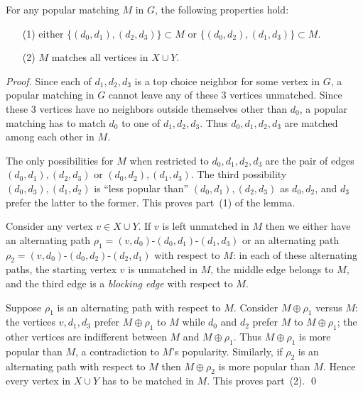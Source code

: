 \documentclass{llncs}
\begin{document}
\begin{lemma}
    \label{new-lemma1}
    For any popular matching $M$ in $G$, the following properties hold:
    \begin{itemize}
    \item[(1)] either $\{(d_0,d_1), (d_2,d_3)\} \subset M$ or $\{(d_0,d_2), (d_1,d_3)\} \subset M$.
    \item[(2)] $M$ matches all vertices in $X \cup Y$.
    \end{itemize}  
\end{lemma}      
\begin{proof}
  Since each of $d_1,d_2,d_3$ is a top choice neighbor for some vertex in $G$, a popular matching in $G$ cannot leave any of these 3 vertices unmatched.
  Since these 3 vertices have no neighbors outside themselves other than $d_0$,
  a popular matching has to match $d_0$ to one of  $d_1,d_2,d_3$.
  Thus $d_0,d_1,d_2,d_3$ are matched among each other in $M$.

  The only possibilities for $M$ when restricted to $d_0,d_1,d_2,d_3$ are the pair of edges $(d_0,d_1), (d_2,d_3)$ or $(d_0,d_2), (d_1,d_3)$.
  The third possibility
  $(d_0,d_3),(d_1,d_2)$ is ``less popular than''  $(d_0,d_1),(d_2,d_3)$ as $d_0,d_2$, and $d_3$ prefer the latter to the former.
  This proves part~(1) of the lemma.

  \smallskip
  
    Consider any vertex $v \in X \cup Y$. If $v$ is left unmatched in $M$ then we either have an alternating path $\rho_1 = (v,d_0)$-$(d_0,d_1)$-$(d_1,d_3)$
    or  an alternating path $\rho_2 = (v,d_0)$-$(d_0,d_2)$-$(d_2,d_1)$ with respect to $M$: in each of these alternating paths, the starting vertex $v$ is
    unmatched in $M$, the middle edge belongs to $M$, and the third edge is a {\em blocking edge} with respect to $M$.

    Suppose $\rho_1$ is an alternating path with respect to $M$. Consider $M \oplus \rho_1$ versus $M$: the vertices $v,d_1,d_3$ prefer $M \oplus \rho_1$
    to $M$ while  $d_0$ and $d_2$ prefer $M$ to $M \oplus \rho_1$; the other vertices are indifferent between $M$ and $M \oplus \rho_1$.
    Thus $M \oplus \rho_1$ is more popular than $M$, a contradiction to $M$'s popularity. Similarly, if $\rho_2$ is an alternating path with respect to $M$
    then $M \oplus \rho_2$ is more popular than $M$. Hence every vertex in $X \cup Y$ has to be matched in $M$. This proves part~(2). \qed
\end{proof}  
  
\end{document}
